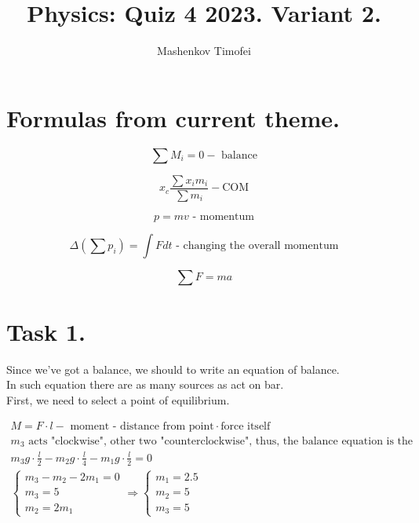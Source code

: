 \documentclass{article}
\title{Physics: Quiz 4 2023. Variant 2.}
\author{Mashenkov Timofei}
\begin{document}
\maketitle{}

\section*{Formulas from current theme.}

\begin{equation*}
  \sum{M_i} = 0 - \text{ balance}
\end{equation*}

\begin{equation*}
  x_c \frac{\sum{x_im_i}}{\sum{m_i}} - \text {COM}
\end{equation*}

\begin{equation*}
  p = mv \text{ - momentum}
\end{equation*}

\begin{equation*}
  \Delta (\sum{p_i}) = \int{Fdt} \text{ - changing the overall momentum}
\end{equation*}

\begin{equation*}
  \sum{F} = ma 
\end{equation*}

\section*{Task 1.}

Since we've got a balance, we should to write an equation of balance. \\
In such equation there are as many sources as act on bar. \\
First, we need to select a point of equilibrium.

\addtolength{\jot}{1pt}
\begin{fleqn}[1\parindent]
  \begin{gather*}
    M = F \cdot l - \text{ moment - distance from point} \cdot \text{force itself} \\
    m_3 \text{ acts "clockwise", other two "counterclockwise", thus, the balance equation is the following:} \\
    m_3g \cdot \frac{l}{2} - m_2g \cdot \frac{l}{4} - m_1g \cdot \frac{l}{2} = 0 \\
    \begin{cases}
      m_3 - m_2 - 2m_1 = 0 \\ 
      m_3 = 5 \\ 
      m_2 = 2m_1
    \end{cases} \Rightarrow
    \begin{cases}
      \boxed{m_1 = 2.5} \\ 
      \boxed{m_2 = 5} \\
      m_3 = 5
    \end{cases}
  \end{gather*}
\end{fleqn}
\end{document}
